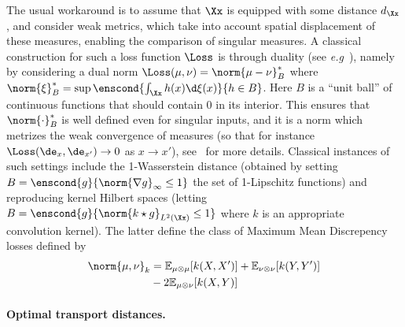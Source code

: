 The usual workaround is to assume that $\Xx$ is equipped with some distance $d_\Xx$, and consider weak metrics, which take into account spatial displacement of these measures, enabling the comparison of singular measures. A classical construction for such a loss function $\Loss$ is through duality (see \emph{e.g}~\cite{sriperumbudur2012empirical}), namely by considering a dual norm $\Loss(\mu,\nu)=\norm{\mu-\nu}_B^*$ where $\norm{\xi}_B^* = \sup\enscond{ \int_\Xx h(x)\d\xi(x) }{ h \in B }$. Here $B$ is a ``unit ball'' of continuous functions that should contain $0$ in its interior. This ensures that $\norm{\cdot}_B^*$ is well defined even for singular inputs, and it is a norm which metrizes the weak convergence of measures (so that for instance $\Loss(\de_x,\de_{x'}) \rightarrow 0$ as $x \rightarrow x'$), see~\cite[Sec.7.2.1]{santambrogio2015optimal} for more details. Classical instances of such settings include the 1-Wasserstein distance (obtained by setting $B = \enscond{g}{\norm{\nabla g}_\infty \leq 1}$ the set of 1-Lipschitz functions) and reproducing kernel Hilbert spaces (letting $B=\enscond{g}{\norm{k \star g}_{L^2(\Xx)} \leq 1}$ where $k$ is an appropriate convolution kernel). The latter define the class of Maximum Mean Discrepency losses \cite{gretton2007kernel} defined by
\begin{equation}
\begin{split}
	\norm{\mu,\nu}_k &= \mathbb{E}_{\mu\otimes\mu}[k(X,X')] + \mathbb{E}_{\nu\otimes \nu}[k(Y,Y')] \\
	&- 2 \mathbb{E}_{\mu\otimes \nu}[k(X,Y)]
\end{split}
\end{equation}  



\paragraph{Optimal transport distances.}


